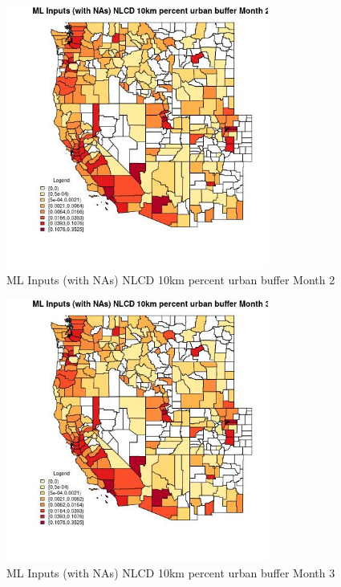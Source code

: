 \begin{figure} 
\centering  
\includegraphics[width=0.77\textwidth]{Code_Outputs/Report_ML_input_PM25_Step4_part_f_de_duplicated_aves_prioritize_24hr_obswNAs_CountyNLCD_10km_percent_urban_buffermedianMonth2.jpg} 
\caption{\label{fig:Report_ML_input_PM25_Step4_part_f_de_duplicated_aves_prioritize_24hr_obswNAsCountyNLCD_10km_percent_urban_buffermedianMonth2}ML Inputs (with NAs) NLCD 10km percent urban buffer Month 2} 
\end{figure} 
 

\begin{figure} 
\centering  
\includegraphics[width=0.77\textwidth]{Code_Outputs/Report_ML_input_PM25_Step4_part_f_de_duplicated_aves_prioritize_24hr_obswNAs_CountyNLCD_10km_percent_urban_buffermedianMonth3.jpg} 
\caption{\label{fig:Report_ML_input_PM25_Step4_part_f_de_duplicated_aves_prioritize_24hr_obswNAsCountyNLCD_10km_percent_urban_buffermedianMonth3}ML Inputs (with NAs) NLCD 10km percent urban buffer Month 3} 
\end{figure} 
 

